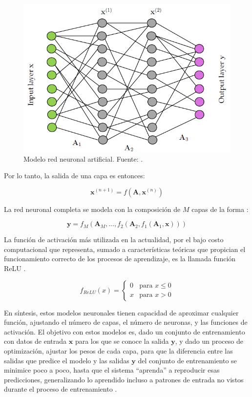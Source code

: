 \begin{figure}[h]
	\centering
	\includegraphics[scale=0.5]{fig/new/RNA.png}
	\caption{Modelo red neuronal artificial. Fuente: \cite{DataScience}.}
	\label{fig:RNA}
\end{figure}

Por lo tanto, la salida de una capa es entonces:

\begin{equation}
\mathbf{x}^{(n+1)} = f(\mathbf{A}, \mathbf{x}^{(n)})
\end{equation}

La red neuronal completa se modela con la composición de $M$ capas de la forma \cite{DataScience}:

\begin{equation}
\mathbf{y} = f_M \left( \mathbf{A}_M ,... , f_2 (\mathbf{A}_2, f_1(\mathbf{A}_1 , \mathbf{x}))  \right)
\end{equation}


La función de activación más utilizada en la actualidad, por el bajo costo computacional que representa, sumado a características teóricas que propician el funcionamiento correcto de los procesos de aprendizaje, es la llamada función ReLU \cite{DataScience}.

\begin{equation}
f_{ReLU}(x) = \left\{ \begin{array}{ll}
0 & \mbox{para $x \leq 0$} \\
x & \mbox{para $x > 0$}
\end{array}
\right.
\end{equation}

En síntesis, estos modelos neuronales tienen capacidad de aproximar cualquier función, ajustando el número de capas, el número de neuronas, y las funciones de activación. El objetivo con estos modelos es, dado un conjunto de entrenamiento con datos de entrada $\mathbf{x}$ para los que se conoce la salida $\mathbf{y}$, y dado un proceso de optimización, ajustar los pesos de cada capa, para que la diferencia entre las salidas que predice el modelo y las salidas $\mathbf{y}$ del conjunto de entrenamiento se minimice poco a poco, hasta que el sistema ``aprenda'' a reproducir esas predicciones, generalizando lo aprendido incluso a patrones de entrada no vistos durante el proceso de entrenamiento \cite{DataScience}.



